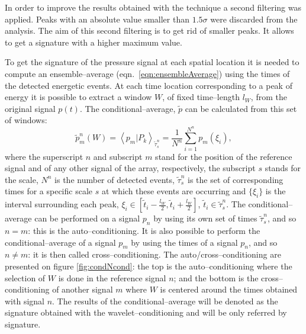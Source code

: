 \documentclass[english]{aiaa-tc}
\begin{document}
In order to improve the results obtained with the technique a second filtering was applied.
Peaks with an absolute value smaller than $1.5\sigma$ were discarded from the analysis.
The aim of this second filtering is to get rid of smaller peaks. It allows to get a signature with a higher maximum value.

To get the signature of the pressure signal at each spatial location it is needed to compute an ensemble--average (eqn.~\ref{eqn:ensembleAverage}) using the times of the detected energetic events.
At each time location corresponding to a peak of energy it is possible to extract a window $W$, of fixed time--length
$l_{W}$, from the original signal $p \left( t \right)$. The conditional--average, $\tilde{p}$ can be calculated from this set of windows:
\begin{equation} \label{eqn:ensembleAverage}
    \tilde{p}^n_{m}\left( W \right) = \left< p_{m} | P_{k} \right>_{\tilde{\tau}^n_{s}} = \frac{1}{N^n} \sum^{N^n}_{i = 1} p_{m}\left(\xi_{i}\right),
\end{equation}
where the superscript $n$ and subscript $m$ stand for the position of the reference signal and of
any other signal of the array, respectively, the subscript $s$ stands for the scale, $N^n$ is the
number of detected events, $\tilde{\tau}^n_{s}$ is the set of corresponding times for a specific
scale $s$ at which these events are occurring and $\{\xi_{i}\}$ is the interval surrounding each peak,
$\xi_{i} \in \left[ \tilde{t}_{i} - \frac{l_{W}}{2}, \tilde{t}_{i} + \frac{l_{W}}{2} \right]$, $\tilde{t}_{i} \in \tilde{\tau}^n_{s}$.
The conditional--average can be performed on a signal $p_{n}$ by using its own set of times ${\tilde{\tau}^n_{s}}$, and so $n = m$:
this is the auto--conditioning. It is also possible to perform the conditional--average of a signal $p_{m}$ by using the times of a
 signal $p_{n}$, and so $n \neq m$: it is then called cross--conditioning. The auto/cross--conditioning are presented on figure
 \ref{fig:condNcond}: the top is the auto--conditioning where the selection of $W$ is done in the reference signal $n$; and the bottom
 is the cross--conditioning of another signal $m$ where $W$ is centered around the times obtained with signal $n$. The results of the
 conditional--average will be denoted as the signature obtained with the wavelet--conditioning and will be only referred by signature.
\end{document}
